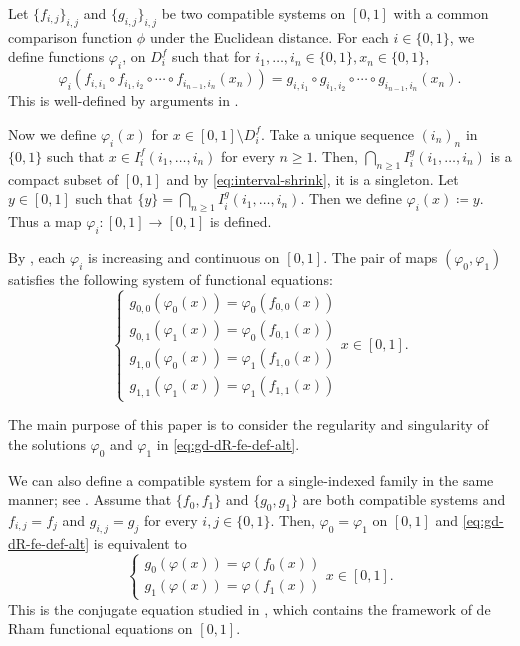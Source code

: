 \documentclass[a4paper, reqno, 11pt]{amsart}
\theoremstyle{definition}
\begin{document}
Let $\{f_{i,j}\}_{i,j}$ and $\{g_{i,j}\}_{i,j}$ be two compatible systems on $[0,1]$ with a common comparison function $\phi$ under the Euclidean distance. 
For each $i \in \{0,1\}$, 
we define functions $\varphi_i$, on $D^f_{i}$ such that for $i_1, \dots, i_n \in \{0,1\}, x_n \in \{0,1\}$, 
\[ \varphi_i \left( f_{i, i_1} \circ f_{i_1, i_2} \circ \cdots \circ f_{i_{n-1}, i_n} (x_n) \right) = g_{i, i_1} \circ g_{i_1, i_2} \circ \cdots \circ g_{i_{n-1}, i_n} (x_n). \]
This is well-defined by arguments in \cite[Section 5]{Okamura2025}. 

Now we define $\varphi_i (x)$ for $x \in [0,1] \setminus  D^{f}_{i}$. 
Take a unique sequence $(i_n)_n$ in $\{0,1\}$ such that $x \in I^f_{i} (i_1, \dots, i_n)$ for every $n \ge 1$. 
Then, 
$\displaystyle \bigcap_{n \ge 1} I^g_{i} (i_1, \dots, i_n)$ is a compact subset of $[0,1]$ and 
by \eqref{eq:interval-shrink}, 
it is a singleton.
Let $y \in [0,1]$ such that $\displaystyle \{y\} = \bigcap_{n \ge 1} I^g_{i} (i_1, \dots, i_n)$. 
Then we define $\varphi_i (x) \coloneqq y$. 
Thus a map $\varphi_i : [0,1] \to [0,1]$ is defined. 

By \cite[Proposition 5.1]{Okamura2025}, 
each $\varphi_i$ is increasing and continuous on $[0,1]$.
The pair of maps $(\varphi_0, \varphi_1)$ satisfies the following system of functional equations: 
\begin{equation}\label{eq:gd-dR-fe-def-alt} 
\begin{cases} g_{0,0}(\varphi_{0}(x)) = \varphi_0 (f_{0,0}(x))  \\ g_{0,1}(\varphi_{1}(x)) = \varphi_0 (f_{0,1}(x))  \\ g_{1,0}(\varphi_{0}(x)) = \varphi_1 (f_{1,0}(x))  \\ g_{1,1}(\varphi_{1}(x)) = \varphi_1 (f_{1,1}(x))  \end{cases}   x \in [0,1]. 
\end{equation}

The main purpose of this paper is to consider the regularity and singularity of the solutions $\varphi_0$ and $\varphi_1$ in \eqref{eq:gd-dR-fe-def-alt}. 

We can also define a compatible system for a single-indexed family in the same manner; see \cite[Subsection 2.1]{Okamura2024}. 
Assume that $\{f_0, f_1\}$ and $\{g_0,g_1\}$ are both compatible systems and $f_{i,j} = f_j$ and $g_{i,j} = g_j$ for every $i, j \in \{0,1\}$. 
Then, $\varphi_0 = \varphi_1$ on $[0,1]$ and 
\eqref{eq:gd-dR-fe-def-alt} is equivalent to 
\begin{equation}\label{eq:ordinal-dR} 
\begin{cases} g_{0}(\varphi(x)) = \varphi (f_{0}(x))  \\  
g_{1}(\varphi(x)) = \varphi(f_{1}(x))  \end{cases}   
x \in [0,1]. 
\end{equation}
This is the conjugate equation studied in \cite{Okamura2019}, which contains the framework of de Rham functional equations on $[0,1]$. 
\end{document}
